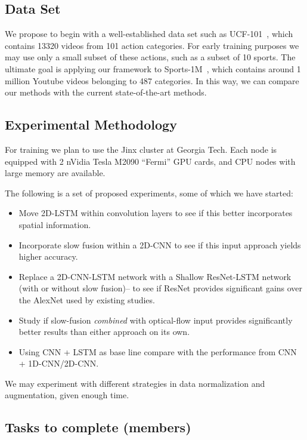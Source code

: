\subsection*{Data Set}
We propose to begin with a well-established data set such as UCF-101~\cite{ucf101}, which contains 13320 videos from 101 action categories. For early training purposes we may use only a small subset of these actions, such as a subset of 10 sports. The ultimate goal is applying our framework to Sports-1M~\cite{cnnvid}, which contains around 1 million Youtube videos belonging to 487 categories. In this way, we can compare our methods with the current state-of-the-art methods.

\subsection*{Experimental Methodology}
For training we plan to use the Jinx cluster at Georgia Tech. Each node is equipped with 2 nVidia Tesla M2090 ``Fermi'' GPU cards, and CPU nodes with large memory are available.

The following is a set of proposed experiments, some of which we have started:
\begin{itemize}
\item Move 2D-LSTM within convolution layers to see if this better incorporates spatial information.
\item Incorporate slow fusion within a 2D-CNN to see if this input approach yields higher accuracy.
\item Replace a 2D-CNN-LSTM network with a Shallow ResNet-LSTM network (with or without slow fusion)-- to see if ResNet provides significant gains over the AlexNet used by existing studies.
\item Study if slow-fusion \emph{combined} with optical-flow input provides significantly better results than either approach on its own.
\item Using CNN + LSTM as base line compare with the performance from CNN + 1D-CNN/2D-CNN.

\end{itemize}
We may experiment with different strategies in data normalization and augmentation, given enough time.

\subsection*{Tasks to complete (members)}

